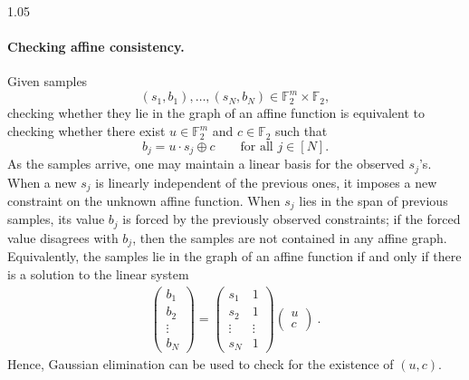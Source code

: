 \documentclass[11pt]{article}
\begin{document}
\begin{algorithm}[H]
\caption{Stabilizer testing with $k$-qubit memory}
\label{alg:tester}
\begin{spacing}{1.05}
\Accept\;
\end{spacing}
\end{algorithm}
\paragraph{Checking affine consistency.}
Given samples
$$
    (s_1,b_1),\ldots,(s_N,b_N)\in\mathbb F_2^m\times\mathbb F_2,
$$
checking whether they lie in the graph of an affine function is equivalent to
checking whether there exist $u\in\mathbb F_2^m$ and $c\in\mathbb F_2$ such
that
$$
    b_j=u\cdot s_j\oplus c
    \qquad\text{for all }j\in[N].
$$
As the samples arrive,
one may maintain a linear basis for the observed $s_j$'s.  When a new
$s_j$ is linearly independent of the previous ones, it imposes a new
constraint on the unknown affine function.  When $s_j$ lies in the span of
previous samples, its value $b_j$ is forced by the previously observed
constraints; if the forced value disagrees with $b_j$, then the samples are
not contained in any affine graph. 
Equivalently, the samples lie in the graph of an affine function if and only if there is a solution to the linear system
\begin{align}
    \begin{pmatrix}
        b_1 \\
        b_2 \\
        \vdots \\
        b_N
    \end{pmatrix} = \begin{pmatrix}
        s_1 & 1 \\
        s_2 & 1\\
        \vdots & \vdots \\
        s_N & 1
    \end{pmatrix}\begin{pmatrix} u \\ c
    \end{pmatrix}\ .
\end{align}
Hence, Gaussian elimination can be used to check for the existence of $(u,c)$.
\end{document}
